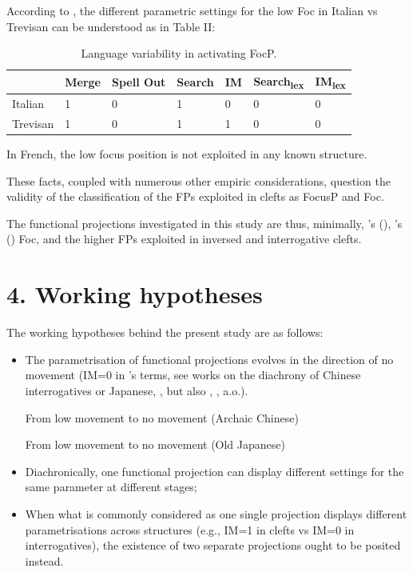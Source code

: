 \documentclass[fleqn,10pt]{wlscirep}
\begin{document}
According to \citet{bonan22}, the different parametric settings for the low Foc in Italian vs Trevisan can be understood as in Table II:

\begin{table}[ht]
    \centering
    \begin{tabular}{|l|l|l|l|l|l|l|}
    \hline
     & Merge & Spell Out & Search & IM & Search\textsubscript{lex} & IM\textsubscript{lex} \\
    \hline
    Italian & 1 & 0 & 1 & 0 & 0 & 0 \\
    \hline
    Trevisan & 1 & 0 & 1 & 1 & 0 & 0\\
    \hline
    \end{tabular}
    \caption{\label{tab:samp2}Language variability in activating FocP.}
    \end{table}

In French, the low focus position is not exploited in any known structure. 

These facts, coupled with numerous other empiric considerations, question the validity of the classification of the FPs exploited in clefts as FocusP and Foc. 

The functional projections investigated in this study are thus, minimally, \citeauthor{rizzi1997fine}’s (\citeyear{rizzi1997fine}), \citeauthor{belletti2004}’s (\citeyear{belletti2004}) Foc, and the higher FPs exploited in inversed and interrogative clefts.

\begin{exe}
    \ex 
\end{exe}

\section*{4. Working hypotheses}
The working hypotheses behind the present study are as follows:

\begin{itemize}
\item The parametrisation of functional projections evolves in the direction of no movement (IM=0 in \citeauthor{rizzi2017}’s \citeyear{rizzi2017} terms, see works on the diachrony of Chinese interrogatives \citealt{aldridge2010clause} or Japanese, \citealt{aldridge2009old}, but also \citealt{roberts2003syntactic}, \citealt{dadan2019}, a.o.).

\begin{exe}
    \ex From low movement to no movement (Archaic Chinese)
\end{exe}
\begin{exe}
    \ex From low movement to no movement (Old Japanese)
\end{exe}

\item Diachronically, one functional projection can display different settings for the same parameter at different stages;

\item When what is commonly considered as one single projection displays different parametrisations across structures (e.g., IM=1 in clefts vs IM=0 in interrogatives), the existence of two separate projections ought to be posited instead.
\end{itemize}
\end{document}
